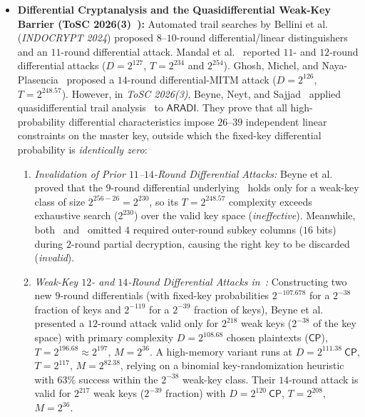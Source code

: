 \documentclass[11pt,a4paper]{article}
\theoremstyle{definition}
\theoremstyle{remark}
\newcommand{\ARADI}{\mathsf{ARADI}}
\newcommand{\CP}{\mathsf{CP}}
\begin{document}
\begin{itemize}[leftmargin=1.8em]
    \item \textbf{Differential Cryptanalysis and the Quasidifferential Weak-Key Barrier (ToSC 2026(3)~\cite{BNS26}):} Automated trail searches by Bellini et al.~\cite{BFG24} (\emph{INDOCRYPT 2024}) proposed $8$--$10$-round differential/linear distinguishers and an $11$-round differential attack. Mandal et al.~\cite{MMRS25} reported $11$- and $12$-round differential attacks ($D = 2^{127}$, $T = 2^{234}$ and $2^{254}$). Ghosh, Michel, and Naya-Plasencia~\cite{GMNP25} proposed a $14$-round differential-MITM attack ($D = 2^{126}$, $T = 2^{248.57}$). However, in \emph{ToSC 2026(3)}, Beyne, Neyt, and Sajjad~\cite{BNS26} applied quasidifferential trail analysis~\cite{BR22} to $\ARADI$. They prove that all high-probability differential characteristics impose $26$--$39$ independent linear constraints on the master key, outside which the fixed-key differential probability is \emph{identically zero}:
    \begin{enumerate}[label=(\alph*),leftmargin=1.5em]
        \item \emph{Invalidation of Prior $11$--$14$-Round Differential Attacks:} Beyne et al.~\cite[Table~1, $\S$3.2, $\S$4.1]{BNS26} proved that the $9$-round differential underlying~\cite{GMNP25} holds only for a weak-key class of size $2^{256-26} = 2^{230}$, so its $T = 2^{248.57}$ complexity exceeds exhaustive search ($2^{230}$) over the valid key space (\emph{ineffective}). Meanwhile, both~\cite{BFG24} and~\cite{MMRS25} omitted $4$ required outer-round subkey columns ($16$ bits) during $2$-round partial decryption, causing the right key to be discarded (\emph{invalid}).
        \item \emph{Weak-Key $12$- and $14$-Round Differential Attacks in~\cite{BNS26}:} Constructing two new $9$-round differentials (with fixed-key probabilities $2^{-107.678}$ for a $2^{-38}$ fraction of keys and $2^{-119}$ for a $2^{-39}$ fraction of keys), Beyne et al.~\cite[$\S$5.2--5.3, $\S$6.1--6.2]{BNS26} presented a $12$-round attack valid only for $2^{218}$ weak keys ($2^{-38}$ of the key space) with primary complexity $D = 2^{108.68}$ chosen plaintexts ($\CP$), $T = 2^{196.68} \approx 2^{197}$, $M = 2^{36}$. A high-memory variant runs at $D = 2^{111.38}~\CP$, $T = 2^{117}$, $M = 2^{82.38}$, relying on a binomial key-randomization heuristic with $63\%$ success within the $2^{-38}$ weak-key class. Their $14$-round attack is valid for $2^{217}$ weak keys ($2^{-39}$ fraction) with $D = 2^{120}~\CP$, $T = 2^{208}$, $M = 2^{36}$.

\end{enumerate}
\end{itemize}
\end{document}
